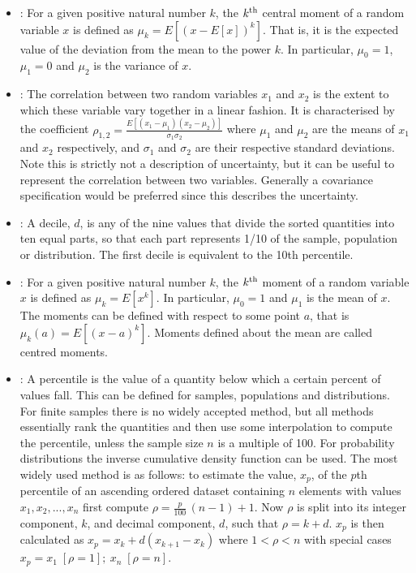 \documentclass[draftspec]{sbmlpkgspec}
\begin{document}
\begin{itemize}
\item {}:  For a given positive natural number $ k $, the $ k\textsuperscript{th} $ central moment of a random variable $ x $ is defined as $ \mu_k = E[(x - E[x])^k] $. That is, it is the expected value of the deviation from the mean to the power $ k $. In particular, $ \mu_0 = 1 $, $ \mu_1 = 0 $ and $ \mu_2 $ is the variance of $ x $.

\item {}:  The correlation between two random variables $ x_1 $ and $ x_2 $ is the extent to which these variable vary together in a linear fashion. It is characterised by the coefficient $ \rho_{1,2} = \frac{E[(x_1-\mu_1)(x_2-\mu_2)]}{\sigma_1\sigma_2} $ where $ \mu_1 $ and $ \mu_2 $ are the means of $ x_1 $ and $ x_2 $ respectively, and $ \sigma_1 $ and $ \sigma_2 $ are their respective standard deviations. Note this is strictly not a description of uncertainty, but it can be useful to represent the correlation between two variables. Generally a covariance specification would be preferred since this describes the uncertainty.

\item {}:  A decile, $ d $, is any of the nine values that divide the sorted quantities into ten equal parts, so that each part represents 1/10 of the sample, population or distribution. The first decile is equivalent to the 10th percentile.

\item {}:  For a given positive natural number $ k $, the $ k\textsuperscript{th} $ moment of a random variable $ x $ is defined as $ \mu_k = E[x^k] $. In particular, $ \mu_0 = 1 $ and $ \mu_1 $ is the mean of $ x $.
The moments can be defined with respect to some point $ a $, that is $ \mu_k(a) = E[(x - a)^k] $. Moments defined about the mean are called centred moments.

\item {}:  A percentile is the value of a quantity below which a certain percent of values fall. This can be defined for samples, populations and distributions. For finite samples there is no widely accepted method, but all methods essentially rank the quantities and then use some interpolation to compute the percentile, unless the sample size $ n $ is a multiple of 100. For probability distributions the inverse cumulative density function can be used.  The most widely used method is as follows: to estimate the value, $ x_p $, of the $ p $th percentile of an ascending ordered dataset containing $ n $ elements with values $ x_1, x_2, ... ,x_n $ first compute $ \rho = \frac{p}{100}\,({n}-1)+1 $. Now $ \rho $ is split into its integer component, $ k $, and decimal component, $ d $, such that $ \rho = k + d $. $ x_p $ is then calculated as $ x_p = x_k+d(x_{k+1}-x_k) $ where $ 1 < \rho < n $ with special cases $ x_p = x_1 \; [\rho=1]; \ x_n \; [\rho=n] $.


\end{itemize}
\end{document}
